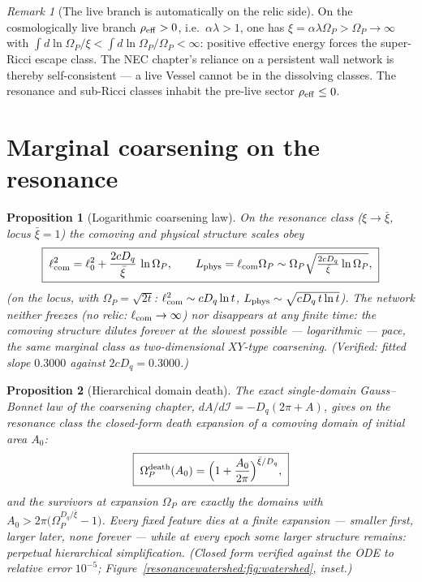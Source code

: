 \documentclass[11pt,a4paper,oneside]{book}
\newcommand{\Op}{\Omega_P}
\newcommand{\Dq}{D_q}
\newcommand{\lcom}{\ell_{\rm com}}
\newcommand{\Lphys}{L_{\rm phys}}
\newcommand{\Ib}{\mathcal I}
\newcommand{\Omd}{\Omega_P^{\rm death}}
\theoremstyle{plain}
\newtheorem{proposition}{Proposition}[chapter]
\theoremstyle{definition}
\theoremstyle{remark}
\newtheorem*{remark}{Remark}
\begin{document}
\begin{remark}[The live branch is automatically on the relic side]
On the cosmologically live branch $\rho_{\rm eff}>0$, i.e.\ $\alpha\lambda>1$, one has
$\xi=\alpha\lambda\Op>\Op\to\infty$ with $\int d\ln\Op/\xi<\int d\ln\Op/\Op<\infty$: positive
effective energy forces the super-Ricci escape class. The NEC chapter's reliance on a persistent wall
network is thereby self-consistent --- a live Vessel cannot be in the dissolving classes. The
resonance and sub-Ricci classes inhabit the pre-live sector $\rho_{\rm eff}\le0$.
\end{remark}

\section{Marginal coarsening on the resonance}

\begin{proposition}[Logarithmic coarsening law]\label{resonancewatershed:prop:log}
On the resonance class ($\xi\to\bar\xi$, locus $\bar\xi=1$) the comoving and physical structure
scales obey
\begin{equation}
\boxed{\;\lcom^2=\ell_0^2+\frac{2c\Dq}{\bar\xi}\,\ln\Op,\qquad
\Lphys=\lcom\Op\sim\Op\sqrt{\tfrac{2c\Dq}{\bar\xi}\ln\Op},\;}
\end{equation}
(on the locus, with $\Op=\sqrt{2t}$: $\lcom^2\sim c\Dq\ln t$, $\Lphys\sim\sqrt{c\Dq\,t\ln t}$).
The network neither freezes (no relic: $\lcom\to\infty$) nor disappears at any finite time: the
comoving structure dilutes forever at the slowest possible --- logarithmic --- pace, the same
marginal class as two-dimensional $XY$-type coarsening. (Verified: fitted slope $0.3000$ against
$2c\Dq=0.3000$.)
\end{proposition}

\begin{proposition}[Hierarchical domain death]\label{resonancewatershed:prop:death}
The exact single-domain Gauss--Bonnet law of the coarsening chapter, $dA/d\Ib=-\Dq(2\pi+A)$, gives on
the resonance class the closed-form death expansion of a comoving domain of initial area $A_0$:
\begin{equation}
\boxed{\;\Omd(A_0)=\Bigl(1+\frac{A_0}{2\pi}\Bigr)^{\bar\xi/\Dq},\;}
\end{equation}
and the survivors at expansion $\Op$ are exactly the domains with
$A_0>2\pi\bigl(\Op^{\Dq/\bar\xi}-1\bigr)$. Every \emph{fixed} feature dies at a finite expansion ---
smaller first, larger later, none forever --- while at every epoch some larger structure remains:
perpetual hierarchical simplification. (Closed form verified against the ODE to relative error
$10^{-5}$; Figure~\ref{resonancewatershed:fig:watershed}, inset.)
\end{proposition}
\end{document}
